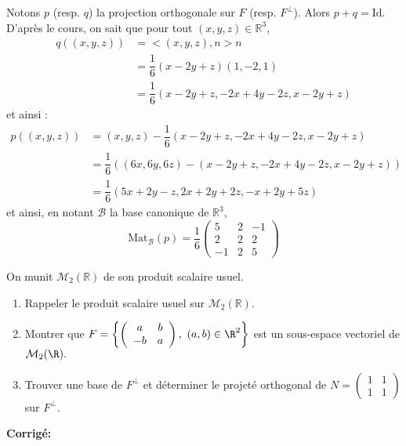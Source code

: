 \documentclass[a4paper,twoside,french,11pt]{VcCours}
\newcommand{\corr}{\textbf{Corrigé:}}
\begin{document}
\noindent Notons $p$ (resp. $q$) la projection orthogonale sur $F$ (resp. $F^{\perp}$). Alors $p+q=\textrm{Id}$. D'après le cours, on sait que pour tout $(x,y,z) \in \mathbb{R}^3$,
\begin{align*}
 q((x,y,z)) & = <(x,y,z),n>n  \\
 & = \dfrac{1}{6} (x-2y+z) (1,-2,1) \\
 & = \dfrac{1}{6} (x-2y+z,-2x+4y-2z,x-2y+z) 
 \end{align*}
 et ainsi :
 \begin{align*}
p((x,y,z)) & = (x,y,z) - \dfrac{1}{6} (x-2y+z,-2x+4y-2z,x-2y+z)  \\
& = \dfrac{1}{6} ( (6x,6y,6z) - (x-2y+z,-2x+4y-2z,x-2y+z)) \\
& = \dfrac{1}{6}(5x+2y-z, 2x+2y+2z,-x+2y+5z)
\end{align*}
et ainsi, en notant $\mathcal{B}$ la base canonique de $\mathbb{R}^3$,
$$ \textrm{Mat}_{\mathcal{B}}(p) = \dfrac{1}{6} \begin{pmatrix}
5 & 2& -1 \\
2 & 2 & 2 \\
-1 & 2& 5
\end{pmatrix}$$

 \begin{Exercice}{} On munit $\mathcal{M}_2(\mathbb{R})$ de son produit scalaire usuel.
\begin{enumerate}
\item Rappeler le produit scalaire usuel sur $\mathcal{M}_{2}(\mathbb{R})$. 
\item Montrer que $F=\left\{\left(\begin{array}{cc} a & b\\ -b & a \end{array}\right),\ (a,b)\in\R^2\right
\}$ est un sous-espace vectoriel de ${\cal M}_2(\R).$
\item Trouver une base de $F^{\perp}$ et déterminer le projeté orthogonal de $N=\left(\begin{array}{cc} 1&1\\ 1&1 \end{array}\right)$ sur $F^{\perp}$.
\end{enumerate}
\end{Exercice}

\corr 
\end{document}
